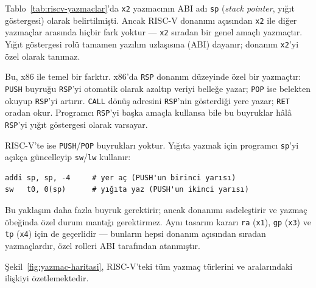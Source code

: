 \begin{bilginot}
Tablo~\ref{tab:riscv-yazmaclar}'da \texttt{x2} yazmacının ABI adı \texttt{sp} (\emph{stack pointer}, yığıt göstergesi) olarak belirtilmişti. Ancak RISC-V donanımı açısından \texttt{x2} ile diğer yazmaçlar arasında hiçbir fark yoktur --- \texttt{x2} sıradan bir genel amaçlı yazmaçtır. Yığıt göstergesi rolü tamamen yazılım uzlaşısına (ABI) dayanır; donanım \texttt{x2}'yi özel olarak tanımaz.

Bu, x86 ile temel bir farktır. x86'da \texttt{RSP} donanım düzeyinde özel bir yazmaçtır: \texttt{PUSH} buyruğu \texttt{RSP}'yi otomatik olarak azaltıp veriyi belleğe yazar; \texttt{POP} ise belekten okuyup \texttt{RSP}'yi artırır. \texttt{CALL} dönüş adresini \texttt{RSP}'nin gösterdiği yere yazar; \texttt{RET} oradan okur. Programcı \texttt{RSP}'yi başka amaçla kullansa bile bu buyruklar hâlâ \texttt{RSP}'yi yığıt göstergesi olarak varsayar.

RISC-V'te ise \texttt{PUSH}/\texttt{POP} buyrukları yoktur. Yığıta yazmak için programcı \texttt{sp}'yi açıkça güncelleyip \texttt{sw}/\texttt{lw} kullanır:
\begin{lstlisting}[style=riscv]
addi sp, sp, -4     # yer aç (PUSH'un birinci yarısı)
sw   t0, 0(sp)      # yığıta yaz (PUSH'un ikinci yarısı)
\end{lstlisting}
Bu yaklaşım daha fazla buyruk gerektirir; ancak donanımı sadeleştirir ve yazmaç öbeğinda özel durum mantığı gerektirmez. Aynı tasarım kararı \texttt{ra} (\texttt{x1}), \texttt{gp} (\texttt{x3}) ve \texttt{tp} (\texttt{x4}) için de geçerlidir --- bunların hepsi donanım açısından sıradan yazmaçlardır, özel rolleri ABI tarafından atanmıştır.
\end{bilginot}

Şekil~\ref{fig:yazmac-haritasi}, RISC-V'teki tüm yazmaç türlerini ve aralarındaki ilişkiyi özetlemektedir.

